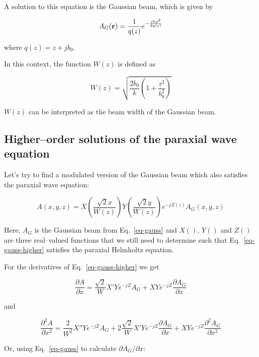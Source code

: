 A solution to this equation is the Gaussian beam, which is given by

\begin{equation}
A_G({\bf r}) = \frac{1}{q(z)}e^{-\frac{jk\rho^2}{2q(z)}} \label{eq-gauss}
\end{equation}   

where $q(z)=z+jb_0$. 

In this context, the function $W(z)$ is defined as

\begin{equation}
W(z)=\sqrt{\frac{2 b_0}{k} \left(1 + \frac{z^2}{b_0^2}\right)} \label{eq-W}
\end{equation} 

$W(z)$ can be interpreted as the beam width of the Gaussian beam.

\subsection{Higher--order solutions of the paraxial wave equation}

Let's try to find a modulated version of the Gaussian beam which also satisfies the paraxial wave equation:

\begin{equation}
A(x,y,z) = X\left({\frac{\sqrt{2}x}{W(z)}}\right) Y\left({\frac{\sqrt{2}y}{W(z)}}\right) e^{-jZ(z)} A_G(x,y,z) \label{eq-gauss-higher}
\end{equation} 

Here, $A_G$ is the Gaussian beam from Eq.~\ref{eq-gauss} and $X()$, $Y()$ and $Z()$ are three real--valued functions that we still need to determine such that Eq.~\ref{eq-gauss-higher} satisfies the paraxial Helmholtz equation.

For the derivatives of Eq.~\ref{eq-gauss-higher} we get

\begin{equation}
\frac{\partial A}{\partial x} = \frac{\sqrt{2}}{W}X'Ye^{-jZ} A_G + XYe^{-jZ} \frac{\partial A_G}{\partial x} 
\end{equation} 

and

\begin{equation}
\frac{\partial^2 A}{\partial x^2} = \frac{2}{W^2}X''Ye^{-jZ} A_G  + 2\frac{\sqrt{2}}{W}X'Ye^{-jZ} \frac{\partial A_G}{\partial x}  + XYe^{-jZ} \frac{\partial^2 A_G}{\partial x^2}
\end{equation} 

Or, using Eq.~\ref{eq-gauss} to calculate $\partial A_G / \partial x$:

